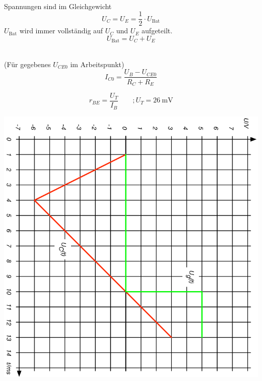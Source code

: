 \documentclass[a5paper, 12pt, twoside]{scrartcl}
\begin{document}
\\
Spannungen sind im Gleichgewicht
\[U_C = U_E = \frac{1}{2} \cdot U_{\text{Bat}}\]
\(U_{\text{Bat}}\) wird immer vollständig auf \(U_C\) und \(U_E\) aufgeteilt.
\[U_{\text{Bat}} = U_C + U_E\]

\begin{minipage}{.49\linewidth}
  \\
  (Für gegebenes \(U_{CE0}\) im Arbeitspunkt)
  \[I_{C0} = \frac{U_B - U_{CE0}}{R_C + R_E}\]

  \[r_{BE} = \frac{U_T}{I_B} \qquad; U_T = \SI{26}{\milli\volt}\]
\end{minipage}\hfill%
\begin{minipage}{.49\linewidth}
  {\centering
    \includegraphics[origin=c, angle=90, width=\textwidth]{20190129_Screenshot4}\par
  }
\end{minipage}
\end{document}
